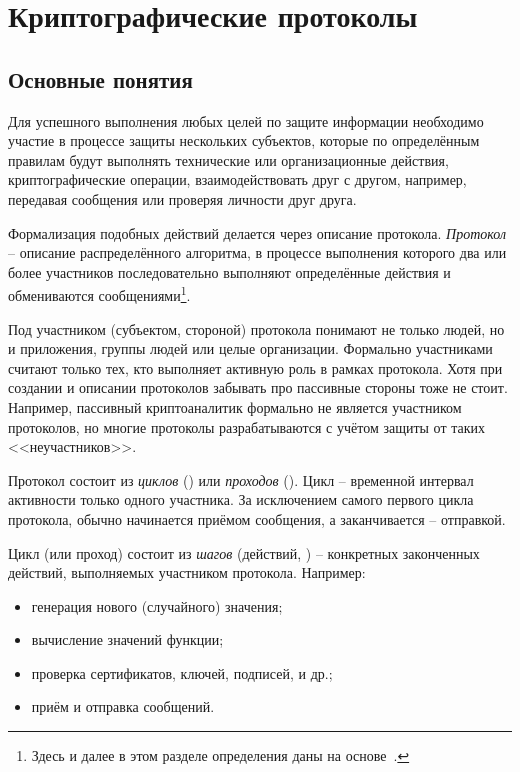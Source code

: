 \chapter{Криптографические протоколы}\label{chapter-protocols}

\section{Основные понятия}

Для успешного выполнения любых целей по защите информации необходимо участие в процессе защиты нескольких субъектов, которые по определённым правилам будут выполнять технические или организационные действия, криптографические операции, взаимодействовать друг с другом, например, передавая сообщения или проверяя личности друг друга.

Формализация подобных действий делается через описание протокола. \emph{Протокол} -- описание распределённого алгоритма, в процессе выполнения которого два или более участников последовательно выполняют определённые действия и обмениваются сообщениями\footnote{Здесь и далее в этом разделе определения даны на основе~\cite{Cheremushkin:2009}.}.

Под участником (субъектом, стороной) протокола понимают не только людей, но и приложения, группы людей или целые организации. Формально участниками считают только тех, кто выполняет активную роль в рамках протокола. Хотя при создании и описании протоколов забывать про пассивные стороны тоже не стоит. Например, пассивный криптоаналитик формально не является участником протоколов, но многие протоколы разрабатываются с учётом защиты от таких <<неучастников>>.

Протокол состоит из \emph{циклов} () или \emph{проходов} (). Цикл -- временной интервал активности только одного участника. За исключением самого первого цикла протокола, обычно начинается приёмом сообщения, а заканчивается -- отправкой.

Цикл (или проход) состоит из \emph{шагов} (действий, ) -- конкретных законченных действий, выполняемых участником протокола. Например:
\begin{itemize}
	\item генерация нового (случайного) значения;
	\item вычисление значений функции;
	\item проверка сертификатов, ключей, подписей, и др.;
	\item приём и отправка сообщений.
\end{itemize}

